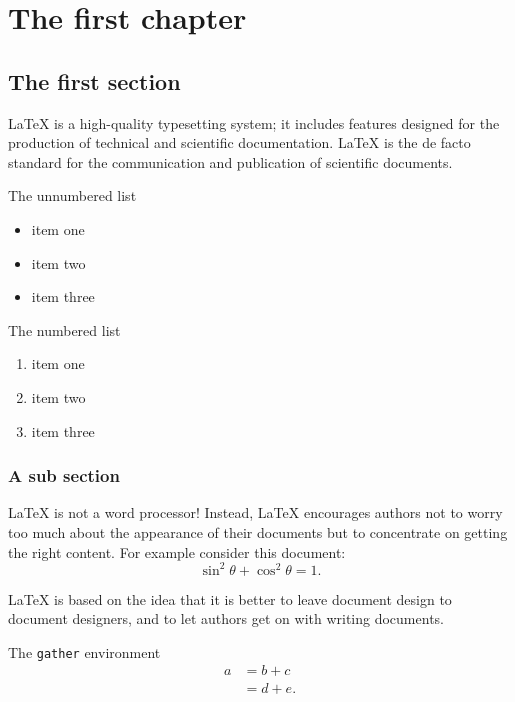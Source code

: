 \documentclass[openany,twoside,12pt]{book}
\theoremstyle{plain}
\numberwithin{equation}{chapter}
\numberwithin{figure}{chapter}
\numberwithin{table}{chapter}
\begin{document}
\cleardoublepage
{}
{}
\tableofcontents


\mainmatter



\chapter{The first chapter}

\section{The first section}\label{my label}
LaTeX is a high-quality typesetting system; it includes features designed for the production of technical and scientific documentation. LaTeX is the de facto standard for the communication and publication of scientific documents.

The unnumbered list
\begin{itemize}
  \item item one
  \item item two
  \item item three
\end{itemize}

The numbered list
\begin{enumerate}
  \item item one
  \item item two
  \item item three
\end{enumerate}

\subsection{A sub section}
LaTeX is not a word processor! Instead, LaTeX encourages authors not to worry too much about the appearance of their documents but to concentrate on getting the right content. For example consider this document:
\begin{equation}\label{eqn:trifun}
\sin^2{\theta}+\cos^2{\theta}=1.
\end{equation}

LaTeX is based on the idea that it is better to leave document design to document designers, and to let authors get on with writing documents.

The \texttt{gather} environment
\begin{align}
a & = b + c \\
& = d + e.
\end{align}
\end{document}
